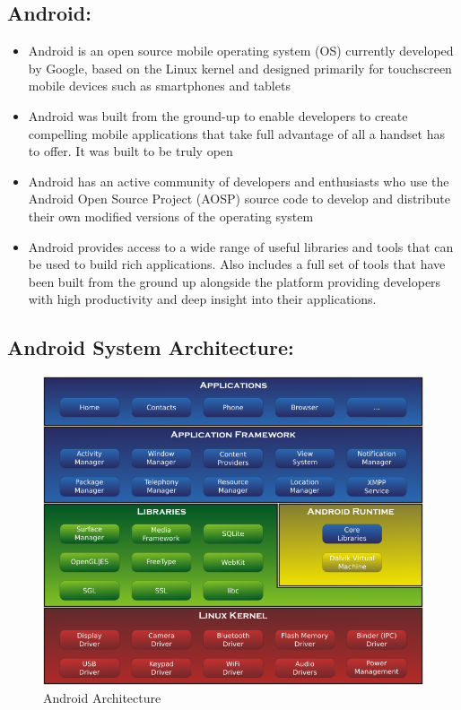 \documentclass{article}
\begin{document}
\subsection{Android:}
	\begin{itemize}
		\item Android is an open source mobile operating system (OS) currently developed by Google, based on the Linux kernel and designed primarily for touchscreen mobile devices such as smartphones and tablets
        \item Android was built from the ground-up to enable developers to create compelling mobile applications that take full advantage of all a handset has to offer. It was built to be truly open
        \item Android has an active community of developers and enthusiasts who use the Android Open Source Project (AOSP) source code to develop and distribute their own modified versions of the operating system
        \item Android provides access to a wide range of useful libraries and tools that can be used to build rich applications. Also includes a full set of tools that have been built from the ground up alongside the platform providing developers with high productivity and deep insight into their applications.
	\end{itemize}
\subsection{Android System Architecture:}
	\begin{figure}[h!]
		\centering
		\includegraphics[scale=0.5]{android_architecture.png}
        \caption{Android Architecture}
        \label{fig:android_arch}
	\end{figure}
\end{document}
